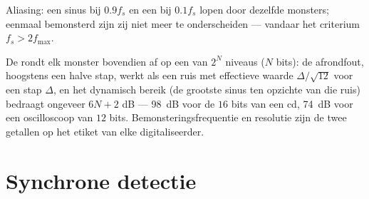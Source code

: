 \begin{omfigure}

{\small Aliasing: een sinus bij $0.9f_s$ en een bij $0.1f_s$ lopen door
dezelfde monsters; eenmaal bemonsterd zijn zij niet meer te onderscheiden
--- vandaar het criterium $f_s > 2f_{\max}$.}
\end{omfigure}

\begin{remark}[Kwantisatie]\label{rem:b2:feedback-oscillators:quantization}
De  rondt elk monster bovendien af op een van $2^N$
niveaus ($N$ bits): de afrondfout, hoogstens een halve stap, werkt als een
ruis met effectieve waarde $\Delta/\sqrt{12}$ voor een stap $\Delta$, en het
dynamisch bereik (de grootste sinus ten opzichte van die ruis) bedraagt
ongeveer $6N + 2$ dB --- \qty{98}{dB} voor de $16$ bits van een cd,
\qty{74}{dB} voor een oscilloscoop van $12$ bits. Bemonsteringsfrequentie en
resolutie zijn de twee getallen op het etiket van elke digitaliseerder.
\end{remark}

\section{Synchrone detectie}

